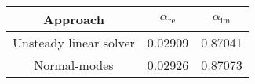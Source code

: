 \begin{tabular*}{\textwidth}{@{\extracolsep{\fill}}ccc}
    \toprule
    Approach & $\alpha_\text{re}$ & $\alpha_\text{im}$ \\ 
    \midrule
Unsteady linear solver & 0.02909 & 0.87041 \\
Normal-modes           & 0.02926 & 0.87073 \\
    \bottomrule
\end{tabular*}

